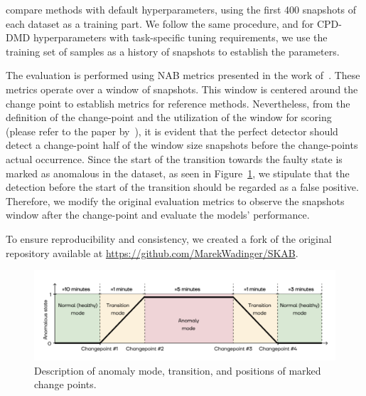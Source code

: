 \citet{Katser2020} compare methods with default hyperparameters, using the first 400 snapshots of each dataset as a training part. We follow the same procedure, and for CPD-DMD hyperparameters with task-specific tuning requirements, we use the training set of samples as a history of snapshots to establish the parameters.

The evaluation is performed using NAB metrics presented in the work of~\citet{Ahmad2017}. These metrics operate over a window of snapshots. This window is centered around the change point to establish metrics for reference methods. Nevertheless, from the definition of the change-point and the utilization of the window for scoring (please refer to the paper by~\citet{Lavin2015}), it is evident that the perfect detector should detect a change-point half of the window size snapshots before the change-points actual occurrence. Since the start of the transition towards the faulty state is marked as anomalous in the dataset, as seen in Figure~\ref{fig:scab_interpretation}, we stipulate that the detection before the start of the transition should be regarded as a false positive. Therefore, we modify the original evaluation metrics to observe the snapshots window after the change-point and evaluate the models' performance.

To ensure reproducibility and consistency, we created a fork of the original repository available at \url{https://github.com/MarekWadinger/SKAB}.

\begin{figure}
    \centering
    \includegraphics[width=\linewidth]{figures/scab-interpretation.png}
    \caption{Description of anomaly mode, transition, and positions of marked change points.}\label{fig:scab_interpretation}
\end{figure}

